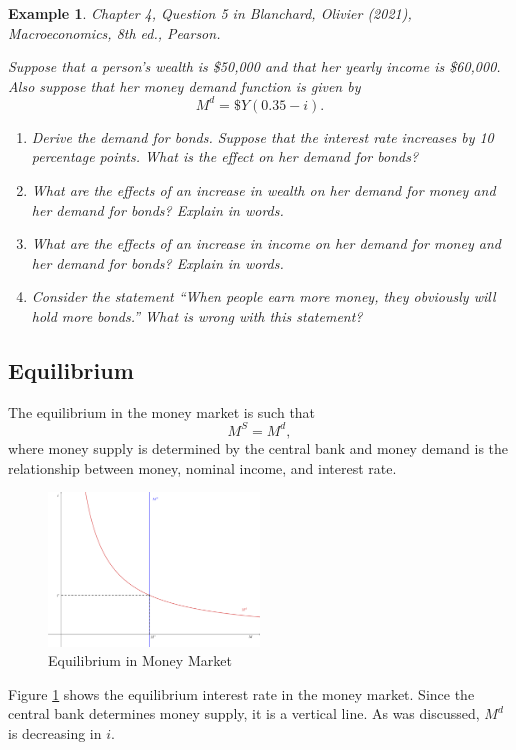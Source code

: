 \documentclass[12pt]{article}
\newtheorem{example}{Example}
\begin{document}
\begin{example}
	Chapter 4, Question 5 in Blanchard, Olivier (2021), \textit{Macroeconomics}, 8th ed., Pearson.

	Suppose that a person's wealth is \$50,000 and that her yearly income is \$60,000. Also suppose that her money demand function is given by
	\[M^d = \$ Y (0.35 - i).\]

	\begin{enumerate}[label=(\alph*)]
		\item Derive the demand for bonds. Suppose that the interest rate increases by 10 percentage points. What is the effect on her demand for bonds?
		\vspace{36pt}
		\item What are the effects of an increase in wealth on her demand for money and her demand for bonds? Explain in words.
		\vspace{36pt}
		\item What are the effects of an increase in income on her demand for money and her demand for bonds? Explain in words.
		\vspace{36pt}
		\item Consider the statement ``When people earn more money, they obviously will hold more bonds.'' What is wrong with this statement?
		\vspace{36pt}
	\end{enumerate}
\end{example}

\subsection*{Equilibrium}
The equilibrium in the money market is such that 
\[M^S = M^d,\]
where money supply is determined by the central bank and money demand is the relationship between money, nominal income, and interest rate. 

\begin{figure}[htp]
    \centering
    \includegraphics[width=0.5\textwidth]{money_eqm_01.png}
    \caption{Equilibrium in Money Market}
    \label{fig:money_eqm_01}
\end{figure}
Figure \ref{fig:money_eqm_01} shows the equilibrium interest rate in the money market. Since the central bank determines money supply, it is a vertical line. As was discussed, $M^d$ is decreasing in $i$.
\end{document}
